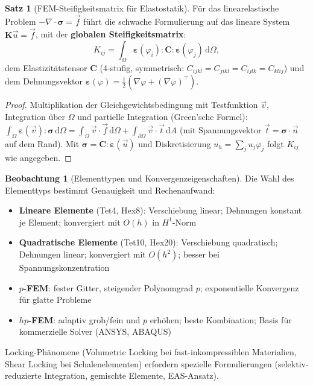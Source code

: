 ﻿\documentclass[a4paper,12pt]{report}
\theoremstyle{definition}
\newtheorem{satz}{Satz}
\newtheorem{beobachtung}{Beobachtung}
\begin{document}
\begin{satz}[FEM-Steifigkeitsmatrix für Elastostatik]
Für das linearelastische Problem $-\nabla\cdot\boldsymbol{\sigma} = \vec{f}$
führt die schwache Formulierung auf das lineare System
$\mathbf{K}\vec{u} = \vec{f}$, mit der \textbf{globalen Steifigkeitsmatrix}:
\[
  K_{ij} = \int_\Omega \boldsymbol{\varepsilon}(\varphi_i):\mathbf{C}:\boldsymbol{\varepsilon}(\varphi_j)\,\mathrm{d}\Omega,
\]
dem Elastizitätstensor $\mathbf{C}$ (4-stufig, symmetrisch: $C_{ijkl} = C_{jikl} = C_{ijlk} = C_{klij}$)
und dem Dehnungsvektor $\boldsymbol{\varepsilon}(\varphi) = \tfrac{1}{2}(\nabla\varphi + (\nabla\varphi)^\top)$.
\end{satz}
\begin{proof}
Multiplikation der Gleichgewichtsbedingung mit Testfunktion $\vec{v}$,
Integration über $\Omega$ und partielle Integration (Green'sche Formel):
$\int_\Omega\boldsymbol{\varepsilon}(\vec{v}):\boldsymbol{\sigma}\,\mathrm{d}\Omega
= \int_\Omega\vec{v}\cdot\vec{f}\,\mathrm{d}\Omega + \int_{\partial\Omega}\vec{v}\cdot\vec{t}\,\mathrm{d}A$
(mit Spannungsvektor $\vec{t} = \boldsymbol{\sigma}\cdot\vec{n}$ auf dem Rand).
Mit $\boldsymbol{\sigma} = \mathbf{C}:\boldsymbol{\varepsilon}(\vec{u})$ und
Diskretisierung $u_h = \sum_j u_j\varphi_j$ folgt $K_{ij}$ wie angegeben.
\end{proof}

\begin{beobachtung}[Elementtypen und Konvergenzeigenschaften]
Die Wahl des Elementtyps bestimmt Genauigkeit und Rechenaufwand:
\begin{itemize}
    \item[-] \textbf{Lineare Elemente} (Tet4, Hex8): Verschiebung linear;
          Dehnungen konstant je Element; konvergiert mit $O(h)$ in $H^1$-Norm
    \item[-] \textbf{Quadratische Elemente} (Tet10, Hex20): Verschiebung quadratisch;
          Dehnungen linear; konvergiert mit $O(h^2)$; besser bei Spannungskonzentration
    \item[-] \textbf{$p$-FEM}: fester Gitter, steigender Polynomgrad $p$;
          exponentielle Konvergenz für glatte Probleme
    \item[-] \textbf{$hp$-FEM}: adaptiv grob/fein und $p$ erhöhen;
          beste Kombination; Basis für kommerzielle Solver (ANSYS, ABAQUS)
\end{itemize}
Locking-Phänomene (Volumetric Locking bei fast-inkompressiblen Materialien,
Shear Locking bei Schalenelementen) erfordern spezielle Formulierungen
(selektiv-reduzierte Integration, gemischte Elemente, EAS-Ansatz).
\end{beobachtung}
\end{document}
